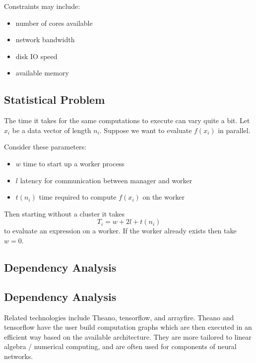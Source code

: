 \documentclass[12pt]{article}
\begin{document}
Constraints may include:

\begin{itemize}
    \item number of cores available
    \item network bandwidth
    \item disk IO speed
    \item available memory
\end{itemize}

\subsection{Statistical Problem}

The time it takes for the same computations to execute can vary quite a
bit. Let $x_i$ be a data vector of length $n_i$. Suppose we want to evaluate
$f(x_i)$ in parallel.

Consider these parameters:

\begin{itemize}
    \item $w$ time to start up a worker process
    \item $l$ latency for communication between manager and worker
    \item $t(n_i)$ time required to compute $f(x_i)$ on the worker
\end{itemize}

Then starting without a cluster it takes
\[
    T_i = w + 2l + t(n_i)
\]
to evaluate an expression on a worker. If the worker already exists then
take $w = 0$.

\subsection{Dependency Analysis}

\subsection{Dependency Analysis}

Related technologies include Theano, tensorflow, and arrayfire. Theano and
tensorflow have the user build computation graphs which are then executed in
an efficient way based on the available architecture. They are more
tailored to linear algebra / numerical computing, and are often used for
components of neural networks.


 
\end{document}

